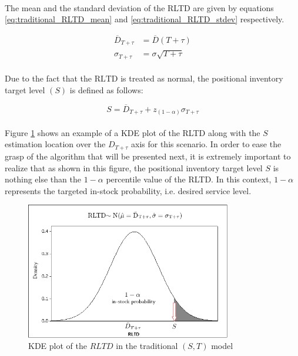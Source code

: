 \documentclass[letterpaper]{article}
\begin{document}
\paragraph{}
The mean and the standard deviation of the RLTD are given by equations \ref{eq:traditional_RLTD_mean} and \ref{eq:traditional_RLTD_stdev} respectively.

\begin{align}
    \overline{D}_{T+\tau} &= \overline{D}(T+\tau) \label{eq:traditional_RLTD_mean}\\
    \sigma_{T+\tau} &= \sigma\sqrt{T+\tau} \label{eq:traditional_RLTD_stdev}
\end{align}

\paragraph{}
Due to the fact that the $\mathrm{RLTD}$ is treated as normal, the positional inventory target level $(S)$ is defined as follows:

\begin{equation}\label{eq:traditional_RLTD_S}
    S = \overline{D}_{T+\tau} + z_{(1-\alpha)}\sigma_{T+\tau}
\end{equation}

\paragraph{}
Figure \ref{fig:RLTD_distribution_normality} shows an example of a KDE plot of the RLTD along with the $S$ estimation location over the $D_{T+\tau}$ axis for this scenario. In order to ease the grasp of the algorithm that will be presented next, it is extremely important to realize that as shown in this figure, the positional inventory target level $S$ is nothing else than the $1-\alpha$ percentile value of the RLTD. In this context, $1-\alpha$ represents the targeted in-stock probability, i.e. desired service level.

\begin{figure}[!hbt]
    \centering
    \includegraphics[width=0.8\textwidth]{./figs/RLTD_distribution_normality.png}
    \caption{KDE plot of the $RLTD$ in the traditional $(S,T)$ model}
    \label{fig:RLTD_distribution_normality}
\end{figure}
\end{document}
